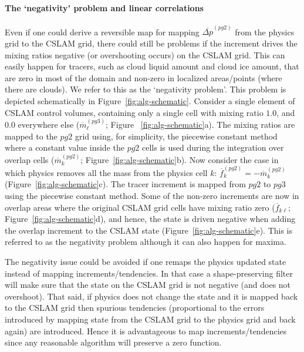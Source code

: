 \paragraph{The `negativity' problem and linear correlations} 
Even if one could derive a reversible map for mapping ${\overline{\Delta p}}^{(pg2)}$ from the physics grid to the CSLAM grid, there could still be problems if the increment drives the mixing ratios negative (or overshooting occurs) on the CSLAM grid. This can easily happen for tracers, such as cloud liquid amount and cloud ice amount, that are zero in most of the domain and non-zero in localized areas/points (where there are clouds). We refer to this as the `negativity problem'. This problem is depicted schematically in Figure~\ref{fig:alg-schematic}. Consider a single element of CSLAM control volumes, containing only a single cell with mixing ratio $1.0$, and $0.0$ everywhere else ($\overline{m}^{(pg3)}_\ell$; Figure ~\ref{fig:alg-schematic}a). The mixing ratios are mapped to the $pg2$ grid using, for simplicity, the piecewise constant method where a constant value inside the $pg2$ cells is used during the integration over overlap cells ($\overline{m}^{(pg2)}_k$; Figure~\ref{fig:alg-schematic}b). Now consider the case in which physics removes all the mass from the physics cell $k$: $\overline{f}^{(pg2)}_k=-\overline{m}^{(pg2)}_k$ (Figure~\ref{fig:alg-schematic}c). The tracer increment is mapped from $pg2$ to $pg3$ using the piecewise constant method. Some of the non-zero increments are now in overlap areas where the original CSLAM grid cells have mixing ratio zero ($\overline{f}_{k\ell}$; Figure~\ref{fig:alg-schematic}d), and hence, the state is driven negative when adding the overlap increment to the CSLAM state (Figure~\ref{fig:alg-schematic}e).  This is referred to as the negativity problem although it can also happen for maxima.

The negativity issue could be avoided if one remaps the physics updated state instead of mapping increments/tendencies. In that case a shape-preserving filter will make sure that the state on the CSLAM grid is not negative (and does not overshoot). That said, if physics does not change the state and it is mapped back to the CSLAM grid then spurious tendencies (proportional to the errors introduced by mapping state from the CSLAM grid to the physics grid and back again) are introduced. Hence it is advantageous to map increments/tendencies since any reasonable algorithm will preserve a zero function.


